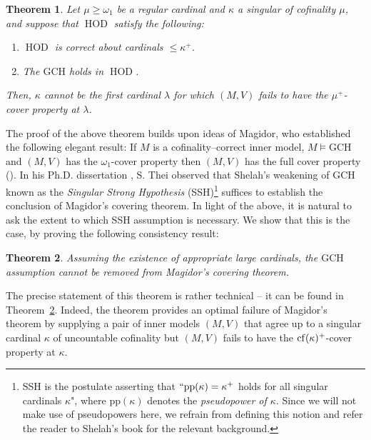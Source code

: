 \documentclass[11pt]{amsart}
\newtheorem{theorem}{Theorem}[section]
\theoremstyle{definition}
\theoremstyle{remark}
\DeclareMathOperator{\HOD}{HOD}
\newcommand{\cf}{{\rm cf}}
\begin{document}
\begin{theorem}\label{cor: compactness of covering}
Let $\mu\geq \omega_1$ be a regular cardinal and   $\kappa$  a singular of  cofinality $\mu$, and suppose that  $\HOD$ satisfy  the following:
    \begin{enumerate}
        \item $\HOD$ is correct about cardinals $\leq \kappa^+$.
        \item The $\mathrm{GCH}$ holds in $\HOD$.
    \end{enumerate}
    Then, $\kappa$ cannot be the first cardinal $\lambda$ for which $(M, V)$ fails to have the $\mu^+$-cover property at $\lambda$.
\end{theorem}
 
 
The proof of the above theorem builds upon ideas of Magidor,  who established the following elegant result: If $M$ is a cofinality--correct inner model, $M\models \mathrm{GCH}$ and $(M,V)$ has the $\omega_1$-cover property then $(M, V)$ has the full cover property (\cite[Theorem~2.33]{AbrahamMagidor}).  In his Ph.D. dissertation \cite{SebaPhD}, S. Thei observed that Shelah's weakening of GCH known as the \emph{Singular Strong Hypothesis} (SSH)\footnote{SSH is the postulate asserting that $``\mathrm{pp}(\kappa)=\kappa^+$ holds for all singular cardinals $\kappa$", where $\mathrm{pp}(\kappa)$ denotes the \emph{pseudopower of $\kappa$}. Since we will not make use of pseudopowers here, we refrain from defining this notion and refer the reader to Shelah's book \cite{ShelahBook} for the relevant background.} suffices to establish the conclusion of Magidor's  covering theorem.  In light of the above, it is natural to ask the  extent to which  SSH assumption  is necessary.  We show that this is the case, by proving the following consistency result:
 
\begin{theorem}\label{thm:optimality of Magidor}
Assuming the existence of appropriate large cardinals, the $\mathrm{GCH}$ assumption cannot be removed from Magidor's covering theorem. 
\end{theorem}
 The precise statement of this theorem is rather technical -- it can be found in Theorem~\ref{thm:optimality of Magidor}. Indeed, the theorem provides an optimal failure of Magidor's theorem by supplying a pair of inner models $(M,V)$ that agree up to a singular cardinal $\kappa$ of uncountable cofinality but $(M,V)$ fails to have the $\cf(\kappa)^+$-cover property at $\kappa$.
 
\smallskip
 
\end{document}

